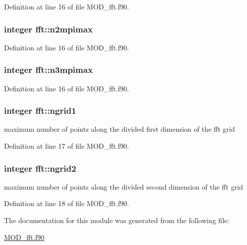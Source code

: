 Definition at line 16 of file M\-O\-D\-\_\-fft.\-f90.

\hypertarget{classfft_a97762b74c5d11ea405cdb20a7d3a7106}{
\subsubsection[{n2mpimax}]{\setlength{\rightskip}{0pt plus 5cm}integer fft\-::n2mpimax}}\label{classfft_a97762b74c5d11ea405cdb20a7d3a7106}


Definition at line 16 of file M\-O\-D\-\_\-fft.\-f90.

\hypertarget{classfft_aee4e8f13c1938be27c7a25e76c81e461}{
\subsubsection[{n3mpimax}]{\setlength{\rightskip}{0pt plus 5cm}integer fft\-::n3mpimax}}\label{classfft_aee4e8f13c1938be27c7a25e76c81e461}


Definition at line 16 of file M\-O\-D\-\_\-fft.\-f90.

\hypertarget{classfft_a94ef6ff65cf001df13131230f327e00c}{
\subsubsection[{ngrid1}]{\setlength{\rightskip}{0pt plus 5cm}integer fft\-::ngrid1}}\label{classfft_a94ef6ff65cf001df13131230f327e00c}


maximum number of points along the divided first dimension of the fft grid 



Definition at line 17 of file M\-O\-D\-\_\-fft.\-f90.

\hypertarget{classfft_a527c2e6b62c23d5b9499656757866ff6}{
\subsubsection[{ngrid2}]{\setlength{\rightskip}{0pt plus 5cm}integer fft\-::ngrid2}}\label{classfft_a527c2e6b62c23d5b9499656757866ff6}


maximum number of points along the divided second dimension of the fft grid 



Definition at line 18 of file M\-O\-D\-\_\-fft.\-f90.



The documentation for this module was generated from the following file\-:\begin{DoxyCompactItemize}
\item 
\hyperlink{MOD__fft_8f90}{M\-O\-D\-\_\-fft.\-f90}\end{DoxyCompactItemize}

